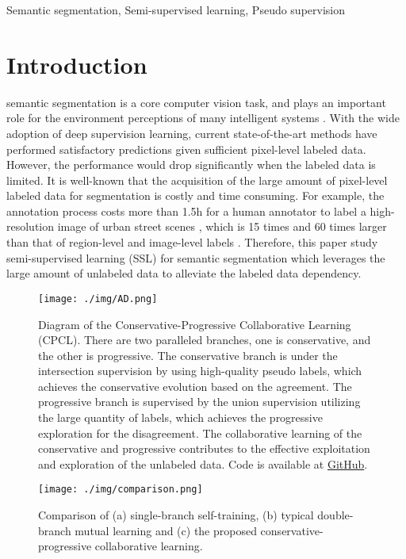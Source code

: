 \documentclass[journal]{IEEEtran}
\begin{document}
\begin{IEEEkeywords}
Semantic segmentation, Semi-supervised learning, Pseudo supervision
\end{IEEEkeywords}


\IEEEpeerreviewmaketitle

\section{Introduction}

 semantic segmentation is a core computer vision task, and plays an important role for the environment perceptions of many 
intelligent systems \cite{zhu2019parallel}. With the wide adoption of deep supervision learning, current state-of-the-art methods have performed satisfactory predictions 
given sufficient pixel-level labeled data. However, the performance would drop significantly when the labeled data is limited. It is well-known 
that the acquisition of the large amount of pixel-level labeled data for segmentation is costly and time consuming. For example, the annotation 
process costs more than 1.5h for a human annotator to label a high-resolution image of urban street scenes \cite{Cityscapes}, which is 15 times 
and 60 times larger than that of region-level and image-level labels \cite{COCO}. Therefore, this paper study semi-supervised learning (SSL) for 
semantic segmentation which leverages the large amount of unlabeled data to alleviate the labeled data dependency.

\begin{figure}[t]
  \centering
  \texttt{[image: ./img/AD.png]}
  \caption{Diagram of the Conservative-Progressive Collaborative Learning (CPCL). There are two paralleled branches, one is conservative, and the other is 
  progressive. The conservative branch is under the intersection supervision by using high-quality pseudo labels, which achieves the conservative evolution 
  based on the agreement. The progressive branch is supervised by the union supervision utilizing the large quantity of labels, which achieves the progressive 
  exploration for the disagreement. The collaborative learning of the conservative and progressive contributes to the effective exploitation and exploration 
  of the unlabeled data. Code is available at \href{https://github.com/leofansq/CPCL}{GitHub}.}
  \label{fig:AD}
\end{figure}

\begin{figure*}[h]
  \centering
  \texttt{[image: ./img/comparison.png]}
  \caption{Comparison of (a) single-branch self-training, (b) typical double-branch mutual learning and (c) the proposed conservative-progressive collaborative learning.}
  \label{fig:comparison}
\end{figure*}
\end{document}
